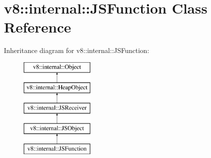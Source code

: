 \hypertarget{classv8_1_1internal_1_1_j_s_function}{}\section{v8\+:\+:internal\+:\+:J\+S\+Function Class Reference}
\label{classv8_1_1internal_1_1_j_s_function}
Inheritance diagram for v8\+:\+:internal\+:\+:J\+S\+Function\+:\begin{figure}[H]
\begin{center}
\leavevmode
\includegraphics[height=5.000000cm]{classv8_1_1internal_1_1_j_s_function}
\end{center}
\end{figure}
